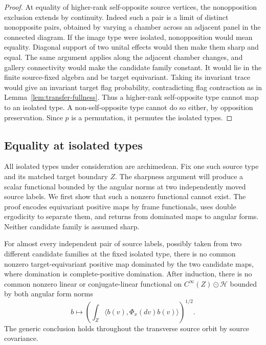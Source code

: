 \begin{proof}
At equality of higher-rank self-opposite source vertices, the
nonopposition exclusion extends by continuity. Indeed such a pair is
a limit of distinct nonopposite pairs, obtained by varying a chamber
across an adjacent panel in the connected diagram. If the image type
were isolated, nonopposition would mean equality. Diagonal support of
two unital effects would then make them sharp and equal. The same
argument applies along the adjacent chamber changes, and gallery
connectivity would make the candidate family constant. It would lie
in the finite source-fixed algebra and be target equivariant. Taking
its invariant trace would give an invariant target flag probability,
contradicting flag contraction as in Lemma~\ref{lem:transfer-fullness}.
Thus a higher-rank self-opposite type cannot map to an isolated type.
A non-self-opposite type cannot do so either, by opposition
preservation. Since $p$ is a permutation, it permutes the isolated
types.
\end{proof}

\subsection{Equality at isolated types}

All isolated types under consideration are archimedean. Fix one such
source type and its matched target boundary $Z$. The sharpness argument will produce a scalar functional bounded by
the angular norms at two independently moved source labels. We first
show that such a nonzero functional cannot exist. The proof encodes
equivariant positive maps by frame functionals, uses double ergodicity
to separate them, and returns from dominated maps to angular forms.
Neither candidate family is assumed sharp.

\begin{lemma}
\label{lem:transfer-disjointness}
For almost every independent pair of source labels, possibly taken
from two different candidate families at the fixed isolated type,
there is no common nonzero target-equivariant positive map dominated
by the two candidate maps, where domination is complete-positive
domination. After induction, there is no common nonzero linear or
conjugate-linear functional on
$C^\infty(Z)\odot\mathcal H$ bounded by both angular form norms
\begin{equation}
 b\longmapsto
 \left(\int_Z\langle b(v),\Phi_x(dv)b(v)\rangle\right)^{1/2}.
 \label{eq:input-3}
\end{equation}
The generic conclusion holds throughout the transverse source orbit
by source covariance.
\end{lemma}

